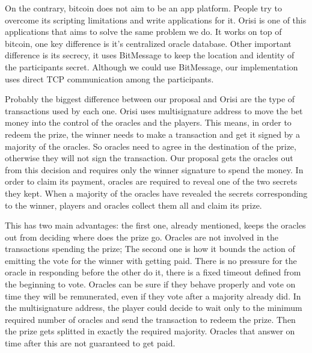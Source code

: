 On the contrary, bitcoin does not aim to be an app platform.
People try to overcome its scripting limitations and write applications for it.
Orisi is one of this applications that aims to solve the same problem we do.
It works on top of bitcoin, one key difference is it's centralized oracle
  database.
Other important difference is its secrecy, it uses BitMessage to keep the
  location and identity of the participants secret.
Although we could use BitMessage, our implementation uses direct TCP
  communication among the participants.

Probably the biggest difference between our proposal and Orisi are the type of
  transactions used by each one.
Orisi uses multisignature address to move the bet money into the control of
  the oracles and the players.
This means, in order to redeem the prize, the winner needs to make a transaction
  and get it signed by a majority of the oracles.
So oracles need to agree in the destination of the prize, otherwise they will
  not sign the transaction.
Our proposal gets the oracles out from this decision and requires only the
  winner signature to spend the money.
In order to claim its payment, oracles are required to reveal one of the two
  secrets they kept.
When a majority of the oracles have revealed the secrets corresponding to the
  winner, players and oracles collect them all and claim its prize.

This has two main advantages: the first one, already mentioned, keeps the
  oracles out from deciding where does the prize go.
Oracles are not involved in the transactions spending the prize;
The second one is how it bounds the action of emitting the vote for the winner
  with getting paid.
There is no pressure for the oracle in responding before the other do it,
  there is a fixed timeout defined from the beginning to vote.
Oracles can be sure if they behave properly and vote on time they will be
  remunerated, even if they vote after a majority already did.
In the multisignature address, the player could decide to wait only to the
  minimum required number of oracles and send the transaction to redeem the
  prize.
Then the prize gets splitted in exactly the required majority.
Oracles that answer on time after this are not guaranteed to get paid.
